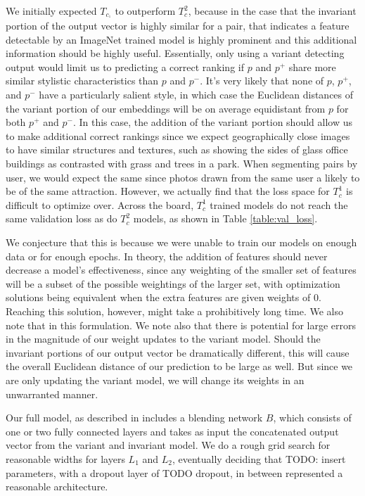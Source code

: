 We initially expected $T_c_^1$ to outperform $T_c^2$, because in the case that the invariant portion of the output vector is highly similar for a pair, that indicates a feature detectable by an ImageNet trained model is highly prominent and this additional information should be highly useful. Essentially, only using a variant detecting output would limit us to predicting a correct ranking if $p$ and $p^+$ share more similar stylistic characteristics than $p$ and $p^-$. It's very likely that none of $p$, $p^+$, and $p^-$ have a particularly salient style, in which case the Euclidean distances of the variant portion of our embeddings will be on average equidistant from $p$ for both $p^+$ and $p^-$. In this case, the addition of the variant portion should allow us to make additional correct rankings since we expect geographically close images to have similar structures and textures, such as showing the sides of glass office buildings as contrasted with grass and trees in a park. When segmenting pairs by user, we would expect the same since photos drawn from the same user a likely to be of the same attraction. However, we actually find that the loss space for $T_c^1$ is difficult to optimize over. Across the board, $T_c^1$ trained models do not reach the same validation loss as do $T_c^2$ models, as shown in Table \ref{table:val_loss}. 

We conjecture that this is because we were unable to train our models on enough data or for enough epochs. In theory, the addition of features should never decrease a model's effectiveness, since any weighting of the smaller set of features will be a subset of the possible weightings of the larger set, with optimization solutions being equivalent when the extra features are given weights of 0. Reaching this solution, however, might take a prohibitively long time. We also note that in this formulation. We note also that there is potential for large errors in the magnitude of our weight updates to the variant model. Should the invariant portions of our output vector be dramatically different, this will cause the overall Euclidean distance of our prediction to be large as well. But since we are only updating the variant model, we will change its weights in an unwarranted manner. 

Our full model, as described in  includes a blending network $B$, which consists of one or two fully connected layers and takes as input the concatenated output vector from the variant and invariant model. We do a rough grid search for reasonable widths for layers $L_1$ and $L_2$, eventually deciding that TODO: insert parameters, with a dropout layer of TODO dropout, in between represented a reasonable architecture.

